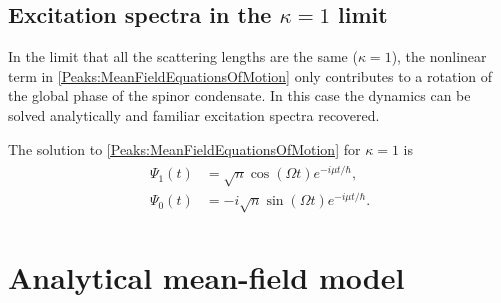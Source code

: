 \subsection{Excitation spectra in the $\kappa = 1$ limit}
In the limit that all the scattering lengths are the same ($\kappa = 1$), the nonlinear term in \eqref{Peaks:MeanFieldEquationsOfMotion} only contributes to a rotation of the global phase of the spinor condensate. In this case the dynamics can be solved analytically and familiar excitation spectra recovered.

The solution to \eqref{Peaks:MeanFieldEquationsOfMotion} for $\kappa = 1$ is
\begin{align}
    \begin{split}
        \Psi_1(t) &= \sqrt{n} \cos(\Omega t) e^{-i \mu t/\hbar},\\
        \Psi_0(t) &= -i\sqrt{n} \sin(\Omega t) e^{-i \mu t/\hbar}.
    \end{split}
    \label{Peaks:Kappa1MeanFieldSolution}
\end{align}


\section{Analytical mean-field model}


